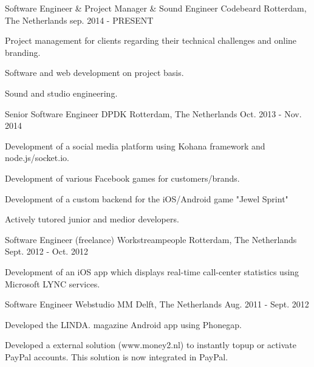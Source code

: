 \begin{cventries}
  \cventry
    {Software Engineer \& Project Manager \& Sound Engineer} %
    {Codebeard} %
    {Rotterdam, The Netherlands} %
    {sep. 2014 - PRESENT} %
    {
      \begin{cvitems} %
        \item {Project management for clients regarding their technical challenges and online branding.}
        \item {Software and web development on project basis.}
        \item {Sound and studio engineering.}
      \end{cvitems}
    }
    
  \cventry
    {Senior Software Engineer} %
    {DPDK} %
    {Rotterdam, The Netherlands} %
    {Oct. 2013 - Nov. 2014} %
    {
      \begin{cvitems} %
        \item {Development of a social media platform using Kohana framework and node.js/socket.io.}
        \item {Development of various Facebook games for customers/brands.}
        \item {Development of a custom backend for the iOS/Android game "Jewel Sprint"}
        \item {Actively tutored junior and medior developers.}
      \end{cvitems}
    }

  \cventry
    {Software Engineer (freelance)} %
    {Workstreampeople} %
    {Rotterdam, The Netherlands} %
    {Sept. 2012 - Oct. 2012} %
    {
      \begin{cvitems} %
        \item {Development of an iOS app which displays real-time call-center statistics using Microsoft LYNC services.}
      \end{cvitems}
    }

  \cventry
    {Software Engineer} %
    {Webstudio MM} %
    {Delft, The Netherlands} %
    {Aug. 2011 - Sept. 2012} %
    {
      \begin{cvitems} %
        \item {Developed the LINDA. magazine Android app using Phonegap.}
        \item {Developed a external solution (www.money2.nl) to instantly topup or activate PayPal accounts. This solution is now integrated in PayPal.}
      \end{cvitems}
    }


\end{cventries}
